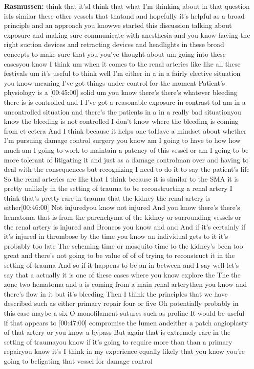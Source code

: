 \documentclass[
]{book}
\begin{document}
\textbf{Rasmussen:} think that it'sI think that what I'm thinking about in
that question isIs similar these other vessels that thatand and
hopefully it's helpful as a broad principle and an approach you knowwe
started this discussion talking about exposure and making sure
communicate with anesthesia and you know having the right suction
devices and retracting devices and headlights in these broad concepts to
make sure that you you've thought about um going into these casesyou
know I think um when it comes to the renal arteries like like all these
festivals um it's useful to think well I'm either in a in a fairly
elective situation you know meaning I've got things under control for
the moment Patient's physiology is a {[}00:45:00{]} solid um you know
there's there's whatever bleeding there is is controlled and I I've got
a reasonable exposure in contrast toI am in a uncontrolled situation and
there's the patients in a in a really bad situationyou know the bleeding
is not controlled I don't know where the bleeding is coming from et
cetera And I think because it helps one toHave a mindset about whether
I'm pursuing damage control surgery you know am I going to have to how
how much am I going to work to maintain a patency of this vessel or am I
going to be more tolerant of litigating it and just as a damage
controlman over and having to deal with the consequences but recognizing
I need to do it to say the patient's life So the renal arteries are like
that I think because it is similar to the SMA it is pretty unlikely in
the setting of trauma to be reconstructing a renal artery I think that's
pretty rare in trauma that the kidney the renal artery is
either{[}00:46:00{]} Not injuredyou know not injured And you know there's
there's hematoma that is from the parenchyma of the kidney or
surrounding vessels or the renal artery is injured and Broncos you know
and and And if it's certainly if it's injured in thrombose by the time
you know an individual gets to it it's probably too late The scheming
time or mosquito time to the kidney's been too great and there's not
going to be value of of of trying to reconstruct it in the setting of
trauma And so if it happens to be an in between and I say well let's say
that a actually it is one of these cases where you know explore the The
the zone two hematoma and a is coming from a main renal arterythen you
know and there's flow in it but it's bleeding Then I think the
principles that we have described such as either primary repair four or
five Oh potentially probably in this case maybe a six O monofilament
sutures such as proline It would be useful if that appears to {[}00:47:00{]}
compromise the lumen andeither a patch angioplasty of that artery or you
know a bypass But again that is extremely rare in the setting of
traumayou know if it's going to require more than than a primary
repairyou know it's I think in my experience equally likely that you
know you're going to beligating that vessel for damage control
\end{document}
